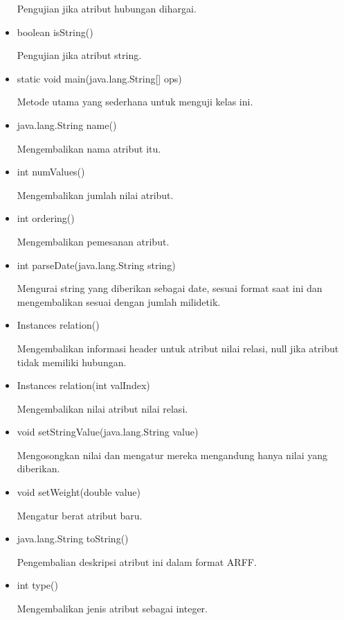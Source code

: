 \begin{itemize}
	Pengujian jika atribut hubungan dihargai.
	
	\item boolean isString()
	
	Pengujian jika atribut string.
	
	\item static void main(java.lang.String[] ops)
	
	Metode utama yang sederhana untuk menguji kelas ini.
	
	\item java.lang.String name()
	
	Mengembalikan nama atribut itu.
	
	\item int numValues()
	
	Mengembalikan jumlah nilai atribut.
	
	\item int ordering()
	
	Mengembalikan pemesanan atribut.
	
	\item int parseDate(java.lang.String string)
	
	Mengurai string yang diberikan sebagai date, sesuai format saat ini dan mengembalikan sesuai dengan jumlah milidetik.
	
	\item Instances relation()
	
	Mengembalikan informasi header untuk atribut nilai relasi, null jika atribut tidak memiliki hubungan.
	
	\item Instances relation(int valIndex)
	
	Mengembalikan nilai atribut nilai relasi.
	
	\item void setStringValue(java.lang.String value)
	
	Mengosongkan nilai dan mengatur mereka mengandung hanya nilai yang diberikan.
	
	\item void setWeight(double value)
	
	Mengatur berat atribut baru.
	
	\item java.lang.String toString()
	
	Pengembalian deskripsi atribut ini dalam format ARFF.
	
	\item int type()
	
	Mengembalikan jenis atribut sebagai integer.
	

\end{itemize}
